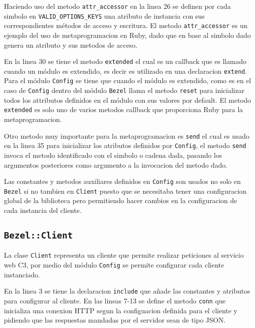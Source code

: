 Haciendo uso del metodo \texttt{attr\_accessor} en la linea 26 se definen por cada
simbolo en \texttt{VALID\_OPTIONS\_KEYS} una atributo de instancia con sus
correspondientes métodos de acceso y escritura. El metodo \texttt{attr\_accessor} es
un ejemplo del uso de metaprogramacion en Ruby, dado que en base al simbolo dado
genera un atributo y sus metodos de acceso.

En la linea 30 se tiene el metodo \texttt{extended} el cual es un callback que es
llamado cuando un módulo es extendido, es decir es utilizado en una declaracion
\texttt{extend}. Para el módulo \texttt{Config} se tiene que cuando el módulo
es extendido, como es en el caso de \texttt{Config} dentro del módulo \texttt{Bezel}
llama el metodo \texttt{reset} para inicializar todos los attributos definidos en
el módulo con sus valores por default. El metodo \texttt{extended} es solo uno
de varios metodos callback que proporciona Ruby para la metaprogramacion.

Otro metodo muy importante para la metaprogramacion es \texttt{send} el cual es usado
en la linea 35 para inicializar los atributos definidos por \texttt{Config}, el
metodo \texttt{send} invoca el metodo identificado con el simbolo o cadena dada,
pasando los argumentos posteriores como argumento a la invocacion del metodo dado.

Las constantes y metodos auxiliares definidos en \texttt{Config} son usados no solo
en \texttt{Bezel} si no tambien en \texttt{Client} puesto que se necesitaba
tener una configuracion global de la biblioteca pero permitiendo hacer cambios
en la configuracion de cada instancia del cliente.

\subsection{\texttt{Bezel::Client}}

La clase \texttt{Client} representa un cliente que permite realizar peticiones al 
servicio web C3, por medio del módulo \texttt{Config} se permite configurar
cada cliente instanciado.



En la linea 3 se tiene la declaracion \texttt{include} que añade las constantes
y atributos para configurar al cliente. En las lineas 7-13 se define el metodo
\texttt{conn} que inicializa una conexion HTTP segun la configuacion definida
para el cliente y pidiendo que las respuestas mandadas por el servidor
sean de tipo JSON. 

